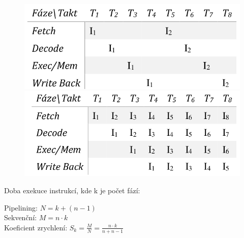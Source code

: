 \begin{figure}[h!]
    \centering
    \begin{minipage}[b]{0.4\textwidth}
        \includegraphics[width=\textwidth]{img/sekv.png}
    \end{minipage}
    \hfill
    \begin{minipage}[b]{0.4\textwidth}
        \includegraphics[width=\textwidth]{img/pipeline.png}
    \end{minipage}
\end{figure}

Doba exekuce instrukcí, kde k je počet fází:
\begin{center}
    Pipelining: \(N = k + (n-1)\) \\
    Sekvenční: \(M = n \cdot k\) \\
    Koeficient zrychlení: \(S_k = \frac{M}{N} = \frac{n \cdot k}{n + n-1}\)
\end{center}

